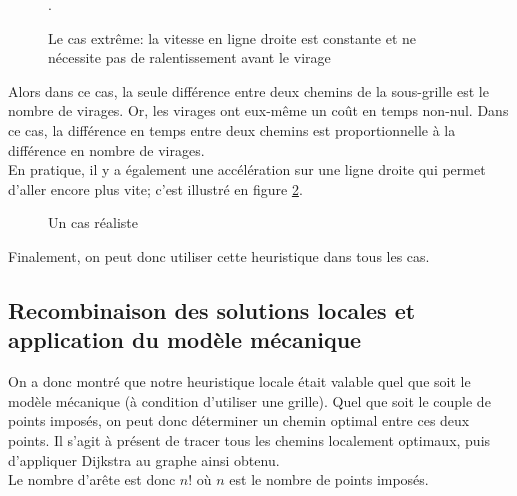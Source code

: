 \begin{figure}
	\centering
	{\small }
	\caption{Le cas extrême: la vitesse en ligne droite est constante et ne nécessite pas de ralentissement avant le virage}.
	\label{fig:grille6}
\end{figure}
Alors dans ce cas, la seule différence entre deux chemins de la sous-grille est le nombre de virages. Or, les virages ont eux-même un coût en temps non-nul. Dans ce cas, la différence en temps entre deux chemins est proportionnelle à la différence en nombre de virages.\\
En pratique, il y a également une accélération sur une ligne droite qui permet d'aller encore plus vite; c'est illustré en figure \ref{fig:grille7}.
\begin{figure}
	\centering
	{\small	}
	\caption{Un cas réaliste}
	\label{fig:grille7}
\end{figure}
Finalement, on peut donc utiliser cette heuristique dans tous les cas.
\subsection{Recombinaison des solutions locales et application du modèle mécanique}
On a donc montré que notre heuristique locale était valable quel que soit le modèle mécanique (à condition d'utiliser une grille). Quel que soit le couple de  points imposés, on peut donc déterminer un chemin optimal entre ces deux points. Il s'agit à présent de tracer tous les chemins localement optimaux, puis d'appliquer Dijkstra au graphe ainsi obtenu.\\
Le nombre d'arête est donc $n!$ où $n$ est le nombre de points imposés.
